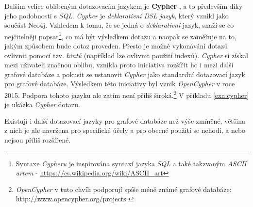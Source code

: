 Dalším velice oblíbeným dotazovacím jazykem je \textbf{Cypher} \cite{Cypher}, a to především díky jeho podobnosti s \textit{SQL}. \textit{Cypher} je \textit{deklarativní DSL jazyk}, který vznikl jako součást Neo4j. Vzhledem k tomu, že se jedná o \textit{deklarativní} jazyk, snaží se co nejčitelněji popsat\footnote{Syntaxe \textit{Cypheru} je inspirována syntaxí jazyka \textit{SQL} a také takzvaným \textit{ASCII artem} - \url{https://cs.wikipedia.org/wiki/ASCII_art}}, co má být výsledkem dotazu a naopak se zaměřuje na to, jakým způsobem bude dotaz proveden. Přesto je možné vykonávání dotazů ovlivnit pomocí tzv. \textit{hintů} (například lze ovlivnit použití indexů). \textit{Cypher} si získal mezi uživateli  značnou oblibu, vznikla proto iniciativa rozšířit ho i mezi další grafové databáze a pokusit se ustanovit \textit{Cypher} jako standardní dotazovací jazyk pro grafové databáze. Výsledkem této iniciativy byl vznik \textit{OpenCypher} \cite{openCypher} v roce 2015. Podpora tohoto jazyku ale zatím není příliš široká.\footnote{\textit{OpenCypher} v tuto chvíli podporují spíše méně známé grafové databáze: \url{http://www.opencypher.org/projects}.} V příkladu \ref{exa:cypher} je ukázka \textit{Cypher} dotazu.



Existují i další dotazovací jazyky pro grafové databáze než výše zmíněné, většina z nich je ale navržena pro specifické účely a pro obecné použití se nehodí, a nebo nejsou příliš rozšířené. 








